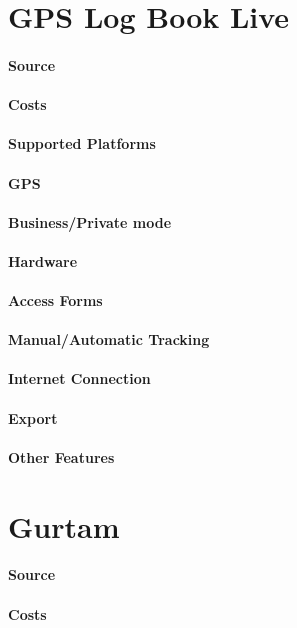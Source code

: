 \section{GPS Log Book Live}
\paragraph{Source} 
\paragraph{Costs} 
\paragraph{Supported Platforms} 
\paragraph{GPS} 
\paragraph{Business/Private mode}
\paragraph{Hardware}
\paragraph{Access Forms}
\paragraph{Manual/Automatic Tracking}
\paragraph{Internet Connection}
\paragraph{Export}
\paragraph{Other Features}
\newpage
\section{Gurtam}
\paragraph{Source} 
\paragraph{Costs} 
